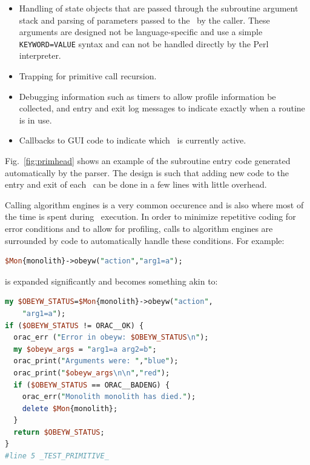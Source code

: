 \documentclass[final,authoryear,5p,times,twocolumn]{elsarticle}
\begin{document}
\begin{itemize}

\item Handling of state objects that are passed through the subroutine
  argument stack and parsing of parameters passed to the \primitive\
  by the caller. These arguments are designed not be language-specific
  and use a simple \texttt{KEYWORD=VALUE} syntax
  and can not be handled directly by the Perl interpreter.

\item Trapping for primitive call recursion.

\item Debugging information
such as timers to allow profile information be
collected, and entry and exit log messages to indicate exactly when
a routine is in use.

\item Callbacks to GUI code to indicate which \primitive\ is
currently active.

\end{itemize}

Fig.\ \ref{fig:primhead} shows an example of the subroutine entry code generated automatically by the
parser. The design is such that adding new code to the entry and exit of each
\primitive\ can be done in a few lines with little overhead.

Calling algorithm engines is a very common occurence and is also where
most of the time is spent during \recipe\ execution. In order to
minimize repetitive coding for error conditions and to allow for profiling, calls to
algorithm engines are surrounded by code to automatically handle these
conditions. For example:

\begin{lstlisting}[language=perl]
$Mon{monolith}->obeyw("action","arg1=a");
\end{lstlisting}

is expanded significantly and becomes something akin to:

\begin{lstlisting}[language=perl]
my $OBEYW_STATUS=$Mon{monolith}->obeyw("action",
    "arg1=a");
if ($OBEYW_STATUS != ORAC__OK) {
  orac_err ("Error in obeyw: $OBEYW_STATUS\n");
  my $obeyw_args = "arg1=a arg2=b";
  orac_print("Arguments were: ","blue");
  orac_print("$obeyw_args\n\n","red");
  if ($OBEYW_STATUS == ORAC__BADENG) {
    orac_err("Monolith monolith has died.");
    delete $Mon{monolith};
  }
  return $OBEYW_STATUS;
}
#line 5 _TEST_PRIMITIVE_
\end{lstlisting}
\end{document}

